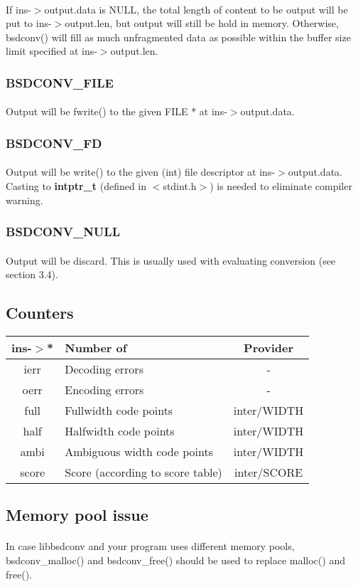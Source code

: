 \documentclass{article}
\begin{document}
				\paragraph{}
				If ins-$>$output.data is NULL, the total length of content to be output will be put to ins-$>$output.len, but output will still be hold in memory. Otherwise, bsdconv() will fill as much unfragmented data as possible within the buffer size limit specified at ins-$>$output.len.
			\subsubsection{BSDCONV\_FILE}
				\paragraph{}
				Output will be fwrite() to the given FILE * at ins-$>$output.data.
			\subsubsection{BSDCONV\_FD}
				\paragraph{}
				Output will be write() to the given (int) file descriptor at ins-$>$output.data. Casting to \textbf{intptr\_t} (defined in $<$stdint.h$>$) is needed to eliminate compiler warning.
			\subsubsection{BSDCONV\_NULL}
				\paragraph{}
				Output will be discard. This is usually used with evaluating conversion (see section 3.4).

		\subsection{Counters}
			\begin{tabular}{|c|l|c|}
				\hline
				ins-$>$* & Number of & Provider \\
				\hline
				ierr & Decoding errors & -\\
				oerr & Encoding errors & -\\
				full & Fullwidth code points & inter/WIDTH \\
				half & Halfwidth code points & inter/WIDTH \\
				ambi & Ambiguous width code points & inter/WIDTH\\
				score & Score (according to score table) & inter/SCORE\\
				\hline
			\end{tabular}
		\subsection{Memory pool issue}
			\paragraph{}
			In case libbsdconv and your program uses different memory pools, bsdconv\_malloc() and bsdconv\_free() should be used to replace malloc() and free().
\end{document}
